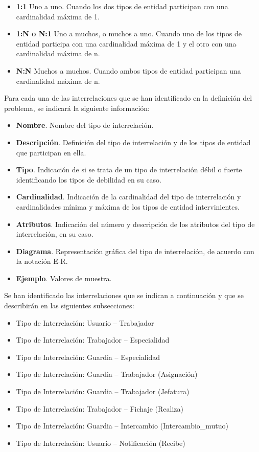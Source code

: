 \begin{itemize}
    \item \textbf{1:1} Uno a uno. Cuando los dos tipos de entidad participan con una cardinalidad máxima de 1.
    \item \textbf{1:N o N:1} Uno a muchos, o muchos a uno. Cuando uno de los tipos de entidad participa con una cardinalidad máxima de 1 y el otro con una cardinalidad máxima de n.
    \item \textbf{N:N} Muchos a muchos. Cuando ambos tipos de entidad participan una cardinalidad máxima de n.
\end{itemize}

Para cada una de las interrelaciones que se han identificado en la definición del problema, se indicará la siguiente información:

\begin{itemize}
    \item \textbf{Nombre}. Nombre del tipo de interrelación.
    \item \textbf{Descripción}. Definición del tipo de interrelación y de los tipos de entidad que participan en ella.
    \item \textbf{Tipo}. Indicación de si se trata de un tipo de interrelación débil o fuerte identificando los tipos de debilidad en su caso.
    \item \textbf{Cardinalidad}. Indicación de la cardinalidad del tipo de interrelación y cardinalidades mínima y máxima de los tipos de entidad intervinientes.
    \item \textbf{Atributos}. Indicación del número y descripción de los atributos del tipo de interrelación, en su caso.
    \item \textbf{Diagrama}. Representación gráfica del tipo de interrelación, de acuerdo con la notación E-R.
    \item \textbf{Ejemplo}. Valores de muestra.
\end{itemize}

Se han identificado las interrelaciones que se indican a continuación y que se describirán en las siguientes subsecciones:

\begin{itemize}
    \item Tipo de Interrelación: Usuario -- Trabajador
    \item Tipo de Interrelación: Trabajador -- Especialidad
    \item Tipo de Interrelación: Guardia -- Especialidad
    \item Tipo de Interrelación: Guardia -- Trabajador (Asignación)
    \item Tipo de Interrelación: Guardia -- Trabajador (Jefatura)
    \item Tipo de Interrelación: Trabajador -- Fichaje (Realiza)
    \item Tipo de Interrelación: Guardia -- Intercambio (Intercambio\_mutuo)
    \item Tipo de Interrelación: Usuario -- Notificación (Recibe)
\end{itemize}

